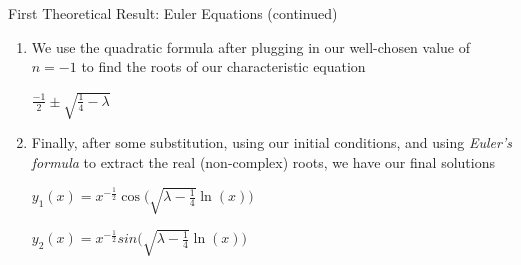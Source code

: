 \documentclass{beamer}
\begin{document}
\begin{frame}{First Theoretical Result: Euler Equations (continued)}

\begin{enumerate}

\suite

\item We use the quadratic formula after plugging in our well-chosen value of $n=-1$ to find the roots of our characteristic equation

\begin{center}

\begin{minipage}{3cm}

\begin{varblock}[3cm]

$\frac{-1}{2} \pm \sqrt{\frac{1}{4}-\lambda}$

\end{varblock}

\end{minipage}

\end{center}

\item Finally, after some substitution, using our initial conditions, and using \textit{Euler's formula} to extract the real (non-complex) roots, we have our final solutions

\begin{center}

\begin{minipage}{6cm}

\begin{varblock}[6cm]

$y_{1}(x)=x^{-\frac{1}{2}}\cos\bigg(\sqrt{\lambda-\frac{1}{4}} \ln(x)\bigg)$

\end{varblock}

\end{minipage}

\end{center}

\begin{center}

\begin{minipage}{6cm}

\begin{varblock}[6cm]

$y_{2}(x)=x^{-\frac{1}{2}}sin\bigg(\sqrt{\lambda-\frac{1}{4}} \ln(x)\bigg)$

\end{varblock}

\end{minipage}

\end{center}

\end{enumerate}

\end{frame}
\end{document}
